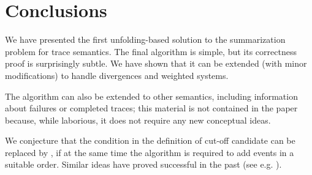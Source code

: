 \documentclass{llncs}
\begin{document}
\section{Conclusions}

We have presented the first unfolding-based solution to the 
summarization problem for trace semantics. The final algorithm is 
simple, but its correctness proof is surprisingly subtle. 
We have shown that it can be extended (with minor modifications) to handle divergences and weighted systems.

The algorithm can also be extended to other semantics,
including information about failures or completed traces;
this material is not contained in the paper because, while laborious,
it does not require any new conceptual ideas. 

We conjecture that the condition  in the definition 
of cut-off candidate 
can be replaced by , if at the same time the algorithm is 
required to add events 
in a suitable order. Similar ideas have proved successful in the past 
(see e.g. \cite{Esparza96,Khomenko03}).




\end{document}
